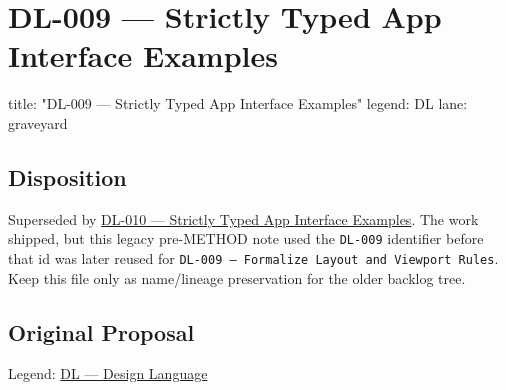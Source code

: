 \chapter{DL-009 --- Strictly Typed App Interface Examples}\label{record-298}

\smallskip

\begin{RecordMeta}
title: "DL-009 — Strictly Typed App Interface Examples"
legend: DL
lane: graveyard

\end{RecordMeta}

\section{Disposition}\label{record-298-disposition}

Superseded by \href{https://github.com/flyingrobots/bijou/blob/cbd70612140e7a450d764b3c7be1c6af878b99bc/docs/method/retro/DL-010-strictly-typed-app-examples.md}{DL-010 --- Strictly Typed App Interface Examples}. The work shipped, but this legacy pre-METHOD note used the \texttt{D\allowbreak{}L\allowbreak{}-\allowbreak{}0\allowbreak{}0\allowbreak{}9} identifier before that id was later reused for \texttt{D\allowbreak{}L\allowbreak{}-\allowbreak{}0\allowbreak{}0\allowbreak{}9\allowbreak{} \allowbreak{}—\allowbreak{} \allowbreak{}F\allowbreak{}o\allowbreak{}r\allowbreak{}m\allowbreak{}a\allowbreak{}l\allowbreak{}i\allowbreak{}z\allowbreak{}e\allowbreak{} \allowbreak{}L\allowbreak{}a\allowbreak{}y\allowbreak{}o\allowbreak{}u\allowbreak{}t\allowbreak{} \allowbreak{}a\allowbreak{}n\allowbreak{}d\allowbreak{} \allowbreak{}V\allowbreak{}i\allowbreak{}e\allowbreak{}w\allowbreak{}p\allowbreak{}o\allowbreak{}r\allowbreak{}t\allowbreak{} \allowbreak{}R\allowbreak{}u\allowbreak{}l\allowbreak{}e\allowbreak{}s}. Keep this file only as name/lineage preservation for the older backlog tree.

\section{Original Proposal}\label{record-298-original-proposal}

Legend: \href{https://github.com/flyingrobots/bijou/blob/1853ad902f6bf219326409e7f743a5a1d6517dbc/docs/method/legends/DL-design-language.md}{DL --- Design Language}

